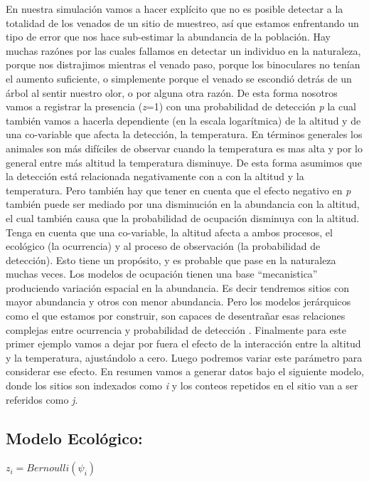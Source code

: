 \documentclass[]{book}
\begin{document}
En nuestra simulación vamos a hacer explícito que no es posible detectar
a la totalidad de los venados de un sitio de muestreo, así que estamos
enfrentando un tipo de error que nos hace sub-estimar la abundancia de
la población. Hay muchas razónes por las cuales fallamos en detectar un
individuo en la naturaleza, porque nos distrajimos mientras el venado
paso, porque los binoculares no tenían el aumento suficiente, o
simplemente porque el venado se escondió detrás de un árbol al sentir
nuestro olor, o por alguna otra razón. De esta forma nosotros vamos a
registrar la presencia (\emph{z}=1) con una probabilidad de detección
\emph{p} la cual también vamos a hacerla dependiente (en la escala
logarítmica) de la altitud y de una co-variable que afecta la detección,
la temperatura. En términos generales los animales son más difíciles de
observar cuando la temperatura es mas alta y por lo general entre más
altitud la temperatura disminuye. De esta forma asumimos que la
detección está relacionada negativamente con a con la altitud y la
temperatura. Pero también hay que tener en cuenta que el efecto negativo
en \emph{p} también puede ser mediado por una disminución en la
abundancia con la altitud, el cual también causa que la probabilidad de
ocupación disminuya con la altitud. Tenga en cuenta que una co-variable,
la altitud afecta a ambos procesos, el ecológico (la ocurrencia) y al
proceso de observación (la probabilidad de detección). Esto tiene un
propósito, y es probable que pase en la naturaleza muchas veces. Los
modelos de ocupación tienen una base ``mecanistica'' produciendo
variación espacial en la abundancia. Es decir tendremos sitios con mayor
abundancia y otros con menor abundancia. Pero los modelos jerárquicos
como el que estamos por construir, son capaces de desentrañar esas
relaciones complejas entre ocurrencia y probabilidad de detección
\citep{Kery2008, KERY2008, Kery2012}. Finalmente para este primer
ejemplo vamos a dejar por fuera el efecto de la interacción entre la
altitud y la temperatura, ajustándolo a cero. Luego podremos variar este
parámetro para considerar ese efecto. En resumen vamos a generar datos
bajo el siguiente modelo, donde los sitios son indexados como \emph{i} y
los conteos repetidos en el sitio van a ser referidos como \emph{j}.

\subsection{Modelo Ecológico:}\label{modelo-ecologico}

\(z _{i} = Bernoulli (\psi _{i})\)
\end{document}

